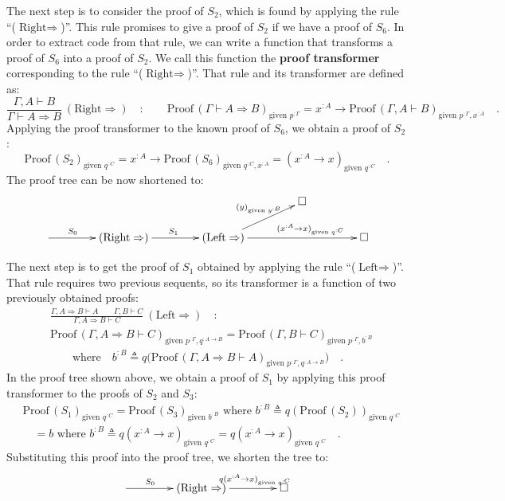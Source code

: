 The next step is to consider the proof of $S_{2}$, which is found
by applying the rule \textsf{``}($\text{Right}\Rightarrow$)\textsf{''}. This rule
promises to give a proof of $S_{2}$ if we have a proof of $S_{6}$.
In order to extract code from that rule, we can write a function that
transforms a proof of $S_{6}$ into a proof of $S_{2}$. We call this
function the \textbf{proof transformer}
corresponding to the rule \textsf{``}($\text{Right}\Rightarrow$)\textsf{''}. That
rule and its transformer are defined as:
\[
\frac{\Gamma,A\vdash B}{\Gamma\vdash A\Rightarrow B}~(\text{Right}\Rightarrow)\quad:\quad\quad\text{Proof}\,(\Gamma\vdash A\Rightarrow B)_{\text{given }p^{:\Gamma}}=x^{:A}\rightarrow\text{Proof}\,(\Gamma,A\vdash B)_{\text{given }p^{:\Gamma},x^{:A}}\quad.
\]
Applying the proof transformer to the known proof of $S_{6}$, we
obtain a proof of $S_{2}$:
\[
\text{Proof}\,(S_{2})_{\text{given }q^{:C}}=x^{:A}\rightarrow\text{Proof}\,(S_{6})_{\text{given }q^{:C},x^{:A}}=(x^{:A}\rightarrow x)_{\text{given }q^{:C}}\quad.
\]
The proof tree can be now shortened to:
\[
\xymatrix{\xyScaleY{1.5pc}\xyScaleX{3.5pc} &  &  & \square\\
\ar[r]\sp(0.35){S_{0}} & (\text{Right}\Rightarrow)\ar[r]\sp(0.5){S_{1}} & (\text{Left}\Rightarrow)\ar[rr]\sp(0.62){(x^{:A}\rightarrow x)_{\text{given }q^{:C}}}\ar[ru]\sp(0.6){(y)_{\text{given }y^{:B}}} &  & \square
}
\]

The next step is to get the proof of $S_{1}$ obtained by applying
the rule \textsf{``}($\text{Left}\Rightarrow$)\textsf{''}. That rule requires two
previous sequents, so its transformer is a function of two previously
obtained proofs:
\begin{align*}
 & \frac{\Gamma,A\Rightarrow B\vdash A\quad\quad\Gamma,B\vdash C}{\Gamma,A\Rightarrow B\vdash C}~(\text{Left}\Rightarrow)\quad:\\
 & \text{Proof}\,(\Gamma,A\Rightarrow B\vdash C)_{\text{given }p^{:\Gamma},q^{:A\rightarrow B}}=\text{Proof}\,(\Gamma,B\vdash C)_{\text{given }p^{:\Gamma},b^{:B}}\\
 & \quad\quad\text{where}\quad b^{:B}\triangleq q\big(\text{Proof}\,(\Gamma,A\Rightarrow B\vdash A)_{\text{given }p^{:\Gamma},q^{:A\rightarrow B}}\big)\quad.
\end{align*}
In the proof tree shown above, we obtain a proof of $S_{1}$ by applying
this proof transformer to the proofs of $S_{2}$ and $S_{3}$:
\begin{align*}
 & \text{Proof}\,(S_{1})_{\text{given }q^{:C}}=\text{Proof}\,(S_{3})_{\text{given }b^{:B}}\text{ where }b^{:B}\triangleq q(\text{Proof}\,(S_{2}))_{\text{given }q^{:C}}\\
 & \quad=b\text{ where }b^{:B}\triangleq q(x^{:A}\rightarrow x)_{\text{given }q^{:C}}=q(x^{:A}\rightarrow x)_{\text{given }q^{:C}}\quad.
\end{align*}
Substituting this proof into the proof tree, we shorten the tree to:
\[
\xymatrix{\xyScaleY{1.5pc}\xyScaleX{3.5pc}\ar[r]\sp(0.35){S_{0}} & (\text{Right}\Rightarrow)\ar[r]\sp(0.65){q(x^{:A}\rightarrow x)_{\text{given }q^{:C}}} & \square}
\]

